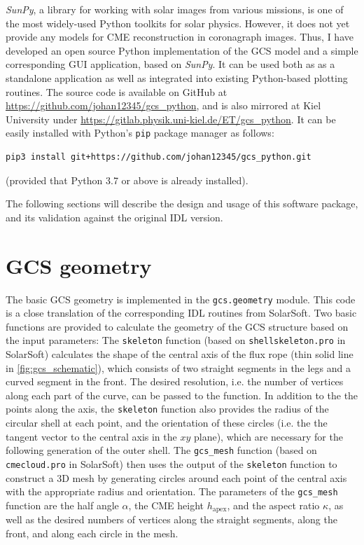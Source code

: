 \textit{SunPy}, a library \citep{sunpy_community2020} for working with solar images from various missions, is one of the most widely-used Python toolkits for solar physics. However, it does not yet provide any models for CME reconstruction in coronagraph images.
Thus, I have developed an open source Python implementation of the GCS model and a simple corresponding GUI application, based on \textit{SunPy}. It can be used both as as a standalone application as well as integrated into existing Python-based plotting routines. The source code is available on GitHub at \url{https://github.com/johan12345/gcs_python}, and is also mirrored at Kiel University under \url{https://gitlab.physik.uni-kiel.de/ET/gcs_python}. It can be easily installed with Python's \texttt{pip} package manager as follows:
\begin{verbatim}
pip3 install git+https://github.com/johan12345/gcs_python.git
\end{verbatim}
(provided that Python 3.7 or above is already installed).

The following sections will describe the design and usage of this software package, and its validation against the original IDL version.

\section{GCS geometry}

The basic GCS geometry is implemented in the \texttt{gcs.geometry} module. This code is a close translation of the corresponding IDL routines from SolarSoft. Two basic functions are provided to calculate the geometry of the GCS structure based on the input parameters: The \texttt{skeleton} function (based on \texttt{shellskeleton.pro} in SolarSoft) calculates the shape of the central axis of the flux rope (thin solid line in \autoref{fig:gcs_schematic}), which consists of two straight segments in the legs and a curved segment in the front. The desired resolution, i.e. the number of vertices along each part of the curve, can be passed to the function.
In addition to the the points along the axis, the \texttt{skeleton} function also provides the radius of the circular shell at each point, and the orientation of these circles (i.e. the the tangent vector to the central axis in the $xy$ plane), which are necessary for the following generation of the outer shell.
The \verb|gcs_mesh| function (based on \texttt{cmecloud.pro} in SolarSoft) then uses the output of the \texttt{skeleton} function to construct a 3D mesh by generating circles around each point of the central axis with the appropriate radius and orientation. The parameters of the \verb|gcs_mesh| function are the half angle $\alpha$, the CME height $h_\text{apex}$, and the aspect ratio $\kappa$, as well as the desired numbers of vertices along the straight segments, along the front, and along each circle in the mesh.

